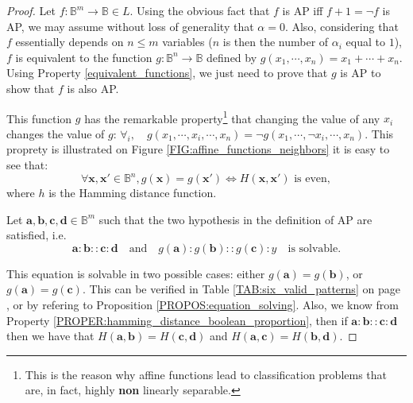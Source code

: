 \begin{proof}
Let $f \colon \mathbb{B}^m \to \mathbb{B} \in L$. Using the obvious fact that
  $f$ is AP  iff $f + 1 = \neg f$ is AP, we may assume without loss of generality that
  $\alpha = 0$. Also, considering that $f$ essentially depends on $n \leq m$
  variables ($n$ is then the number of $\alpha_i$ equal to $1$), $f$ is
  equivalent to the function $g \colon \mathbb{B}^n \to \mathbb{B}$ defined by
  $g(x_1, \cdots, x_n) = x_1 +  \cdots + x_n$. Using Property
  \ref{equivalent_functions}, we just need to prove that $g$ is AP to show that
  $f$ is also AP.

  This function $g$ has the remarkable property\footnote{This is the reason why affine
  functions lead to classification problems that are, in fact, highly
  \textbf{non} linearly separable.} that changing the value of any
  $x_i$ changes the value of $g$: $\forall _i, \quad g(x_1, \cdots, x_i, \cdots, x_n) =
  \neg g(x_1, \cdots, \neg x_i, \cdots, x_n)$. This proprety is illustrated on
  Figure \ref{FIG:affine_functions_neighbors} it is easy to
  see that:
  $$\forall \mathbf{x}, \mathbf{x}' \in \mathbb{B}^n, g(\mathbf{x}) =
  g(\mathbf{x}') \iff H(\mathbf{x}, \mathbf{x}') \text{ is even},$$
  where $h$ is the Hamming distance function.

  Let $\mathbf{a}, \mathbf{b}, \mathbf{c}, \mathbf{d} \in \mathbb{B}^m$  such
  that the two hypothesis in the definition of AP are satisfied, i.e.
  $$
  \mathbf{a} : \mathbf{b} :: \mathbf{c} : \mathbf{d}\quad \text{and}\quad
  g(\mathbf{a}) : g(\mathbf{b}) :: g(\mathbf{c}) : y\quad  \text{is  solvable}.
  $$

  This equation is solvable in two possible cases: either $g(\mathbf{a}) =
  g(\mathbf{b})$, or $g(\mathbf{a}) = g(\mathbf{c})$. This can be verified in
  Table \ref{TAB:six_valid_patterns} on page \pageref{TAB:six_valid_patterns},
  or by refering to Proposition \ref{PROPOS:equation_solving}.
  Also, we know from Property \ref{PROPER:hamming_distance_boolean_proportion},
  then if $\mathbf{a} : \mathbf{b} :: \mathbf{c} : \mathbf{d}$ then we have
  that $H(\mathbf{a}, \mathbf{b}) = H(\mathbf{c}, \mathbf{d})$ and
  $H(\mathbf{a}, \mathbf{c}) = H(\mathbf{b}, \mathbf{d})$.


\end{proof}
